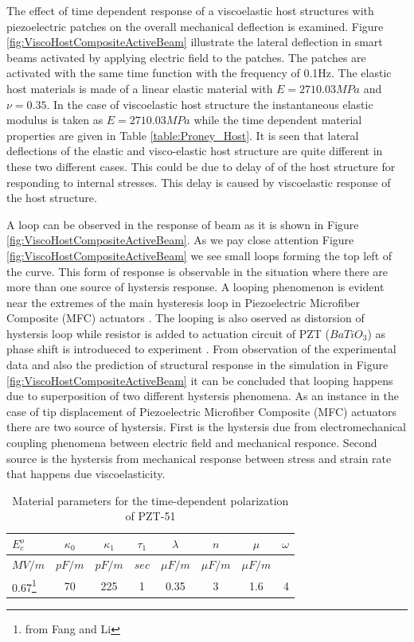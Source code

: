 The effect of time dependent response of a viscoelastic host structures with piezoelectric patches on the overall mechanical deflection is examined. 
Figure \ref{fig:ViscoHostCompositeActiveBeam} illustrate the lateral deflection in smart beams activated by applying electric field to the patches. 
The patches are activated with the same time function with the frequency of 0.1Hz. 
The elastic host materials is made of a linear elastic material with $E=2710.03 MPa$ and $\nu = 0.35$. 
In the case of viscoelastic host structure the instantaneous elastic modulus is taken as $E=2710.03 MPa$ while the time dependent material properties are given in Table \ref{table:Proney_Host}. 
It is seen that lateral deflections of the elastic and visco-elastic host structure are quite different in these two different cases. 
This could be due to delay of of the host structure for responding to internal stresses. 
This delay is caused by viscoelastic response of the host structure.

A loop can be observed in the response of beam as it is shown in Figure \ref{fig:ViscoHostCompositeActiveBeam}. 
As we pay close attention Figure \ref{fig:ViscoHostCompositeActiveBeam} we see small loops forming the top left of the curve.
This form of response is observable in the situation where there are more than one source of hystersis response.
A looping phenomenon is evident near the extremes of the main hysteresis loop in Piezoelectric Microfiber Composite (MFC) actuators \cite{usher2013piezoelectric}.
The looping is also oserved as distorsion of hystersis loop while resistor is added to actuation circuit of PZT ($BaTiO_3$) as phase shift is introdueced to experiment \cite{jaffe2012piezoelectric}.
From observation of the experimental data and also the prediction of structural response in the simulation in Figure \ref{fig:ViscoHostCompositeActiveBeam} it can be concluded that looping happens due to superposition of two different hystersis phenomena.
As an instance in the case of tip displacement of Piezoelectric Microfiber Composite (MFC) actuators \cite{usher2013piezoelectric} there are two source of hystersis.
First is the hystersis due from electromechanical coupling phenomena between electric field and mechanical responce.
Second source is the hystersis from mechanical response between stress and strain rate that happens due viscoelasticity.   

\newpage

\begin{table}   
\caption{Material parameters for the time-dependent polarization of PZT-51}
\centering
\begin{tabular}{l c c c c c c r}
\hline 
$E_c^o$ & $\kappa_0$ & $\kappa_1$ & $\tau_1$ & $\lambda$ & $ n $ & $\mu$&  $\omega$ \\ \hline
$MV/m$ & $pF/m$ & $pF/m$ &  $sec$ & $\mu F/m$ & $\mu F/m $& $\mu F/m $\\ \hline 
0.67\footnote{from Fang and Li\cite{raey}}&70&225&1&0.35&3&1.6&4\\ \hline
\end{tabular}
\label{table:MatPZT-51}
\end{table}

